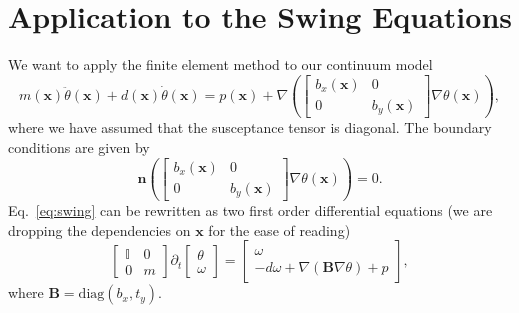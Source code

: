 \documentclass[aps,pre]{revtex4-2}
\begin{document}
\section{Application to the Swing Equations}
We want to apply the finite element method to our continuum model~\cite{pagnier_fritzsch_jacquod_chertkov_2022}
\begin{equation}\label{eq:swing}
	m(\bm{x})\ddot{\theta}(\bm{x}) + d(\bm{x})\dot{\theta}(\bm{x}) = p(\bm{x}) + \nabla\left(\begin{bmatrix}b_x(\bm{x}) & 0\\ 0 & b_y(\bm{x})\end{bmatrix}\nabla \theta(\bm{x})\right),
\end{equation}
where we have assumed that the susceptance tensor is diagonal.
The boundary conditions are given by
\begin{equation}
	\bm{n} \left(\begin{bmatrix}b_x(\bm{x}) & 0\\ 0 & b_y(\bm{x})\end{bmatrix}\nabla \theta(\bm{x})\right)= 0.
\end{equation}
Eq.~\eqref{eq:swing} can be rewritten as two first order differential equations (we are dropping the dependencies on $\bm{x}$ for the ease of reading)
\begin{equation}
	\begin{bmatrix}\mathbb{I} & 0\\0 & m\end{bmatrix}\partial_t\begin{bmatrix}\theta\\\omega\end{bmatrix} = \begin{bmatrix}\omega\\-d\omega + \nabla(\bm{B}\nabla \theta) + p\end{bmatrix},
\end{equation}
where $\bm{B} = \mathrm{diag}(b_x, t_y)$.
\end{document}

